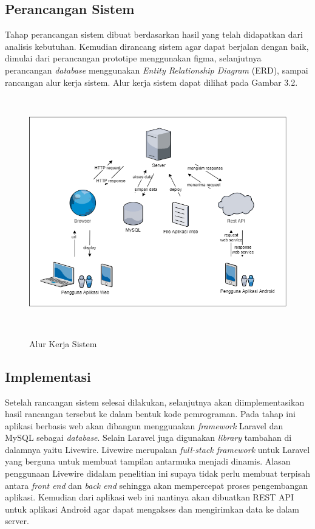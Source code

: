 
\subsection{Perancangan Sistem}
Tahap perancangan sistem dibuat berdasarkan hasil yang telah didapatkan dari analisis kebutuhan. Kemudian dirancang sistem agar dapat berjalan dengan baik, dimulai dari perancangan prototipe menggunakan figma, selanjutnya perancangan \textit{database} menggunakan \textit{Entity Relationship Diagram} (ERD), sampai rancangan alur kerja sistem. Alur kerja sistem dapat dilihat pada Gambar 3.2.

\begin{figure}[H]
\centering
{\includegraphics [width = 14cm, height= 10cm]{gambar/alur_kerja_sistem}}
\caption{Alur Kerja Sistem}
\label{alur_kerja_sistem}
\end{figure}

\subsection{Implementasi}
Setelah rancangan sistem selesai dilakukan, selanjutnya akan diimplementasikan hasil rancangan tersebut ke dalam bentuk kode pemrograman. Pada tahap ini aplikasi berbasis web akan dibangun menggunakan \textit{framework} Laravel dan MySQL sebagai \textit{database}. Selain Laravel juga digunakan \textit{library} tambahan di dalamnya yaitu Livewire. Livewire merupakan \textit{full-stack framework} untuk Laravel yang berguna untuk membuat tampilan antarmuka menjadi dinamis. Alasan penggunaan Livewire didalam penelitian ini supaya tidak perlu membuat terpisah antara \textit{front end} dan \textit{back end} sehingga akan mempercepat proses pengembangan aplikasi. Kemudian dari aplikasi web ini nantinya akan dibuatkan REST API untuk aplikasi Android agar dapat mengakses dan mengirimkan data ke dalam server.

